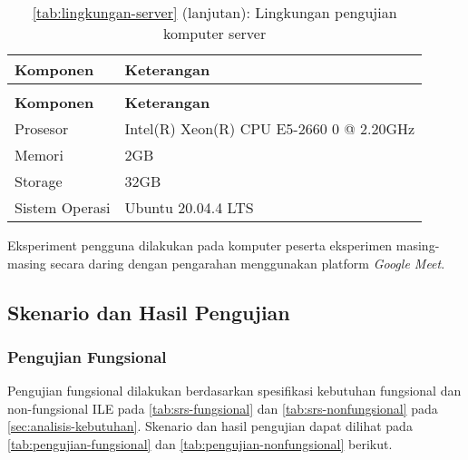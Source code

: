\small
\begin{longtable}[c]{|l|l|}
  \caption{Lingkungan pengujian komputer server} \label{tab:lingkungan-server}                \\ \hline
  \rowcolor{gray!30}
  \textbf{Komponen} & \textbf{Keterangan}                                                     \\ \hline
  \endfirsthead
  \caption*{\autoref{tab:lingkungan-server} (lanjutan): Lingkungan pengujian komputer server} \\ \hline
  \rowcolor{gray!30}
  \textbf{Komponen} & \textbf{Keterangan}                                                     \\ \hline
  \endhead
  Prosesor          & Intel(R) Xeon(R) CPU E5-2660 0 @ 2.20GHz                                \\ \hline
  Memori            & 2GB                                                                     \\ \hline
  Storage           & 32GB                                                                    \\ \hline
  Sistem Operasi    & Ubuntu 20.04.4 LTS                                                      \\ \hline
\end{longtable}
\normalsize

Eksperiment pengguna dilakukan pada komputer peserta eksperimen masing-masing secara daring dengan pengarahan menggunakan platform \textit{Google Meet}.

\subsection{Skenario dan Hasil Pengujian}

\subsubsection{Pengujian Fungsional}
Pengujian fungsional dilakukan berdasarkan spesifikasi kebutuhan fungsional dan non-fungsional ILE pada \autoref{tab:srs-fungsional} dan \autoref{tab:srs-nonfungsional} pada \autoref{sec:analisis-kebutuhan}. Skenario dan hasil pengujian dapat dilihat pada \autoref{tab:pengujian-fungsional} dan \autoref{tab:pengujian-nonfungsional} berikut.

